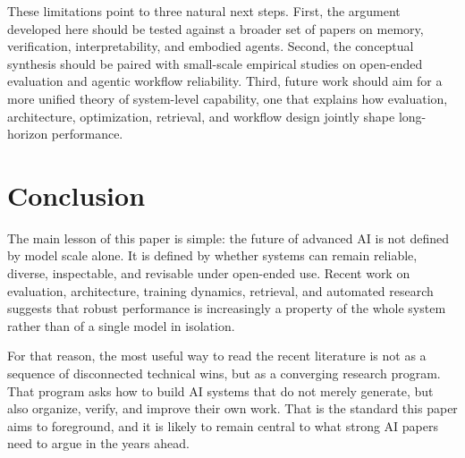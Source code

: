 These limitations point to three natural next steps. First, the argument developed here should be tested against a broader set of papers on memory, verification, interpretability, and embodied agents. Second, the conceptual synthesis should be paired with small-scale empirical studies on open-ended evaluation and agentic workflow reliability. Third, future work should aim for a more unified theory of system-level capability, one that explains how evaluation, architecture, optimization, retrieval, and workflow design jointly shape long-horizon performance.

\section{Conclusion}
The main lesson of this paper is simple: the future of advanced AI is not defined by model scale alone. It is defined by whether systems can remain reliable, diverse, inspectable, and revisable under open-ended use. Recent work on evaluation, architecture, training dynamics, retrieval, and automated research suggests that robust performance is increasingly a property of the whole system rather than of a single model in isolation.

For that reason, the most useful way to read the recent literature is not as a sequence of disconnected technical wins, but as a converging research program. That program asks how to build AI systems that do not merely generate, but also organize, verify, and improve their own work. That is the standard this paper aims to foreground, and it is likely to remain central to what strong AI papers need to argue in the years ahead.

